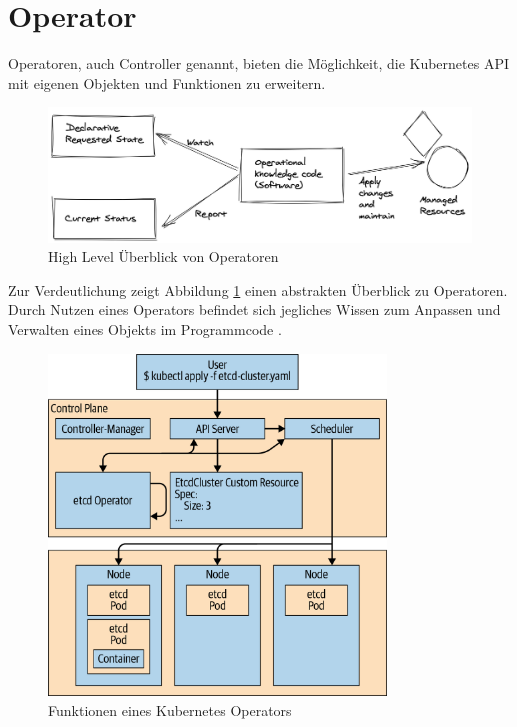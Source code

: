 \section{Operator}
\label{sec:komponenten:operator}

Operatoren, auch Controller genannt, bieten die Möglichkeit, die Kubernetes API mit eigenen Objekten und Funktionen zu erweitern.

\begin{figure}[h]
  \centering
  \includegraphics[width=\textwidth]{gfx/chapters/3_komponenten/operator_highlevel.png}
  \caption{High Level Überblick von Operatoren}
  \label{fig:kubernetes_operator_highlevel}
\end{figure}

Zur Verdeutlichung zeigt Abbildung \ref{fig:kubernetes_operator_highlevel} einen abstrakten Überblick zu Operatoren. 
Durch Nutzen eines Operators befindet sich jegliches Wissen zum Anpassen und Verwalten eines Objekts im Programmcode \cite{operatorWhitepaper}.

\begin{figure}[h]
  \centering
  \includegraphics[width=0.8\textwidth]{gfx/chapters/3_komponenten/operator_example.png}
  \caption{Funktionen eines Kubernetes Operators}
  \label{fig:kubernetes_operator_example}
\end{figure}

